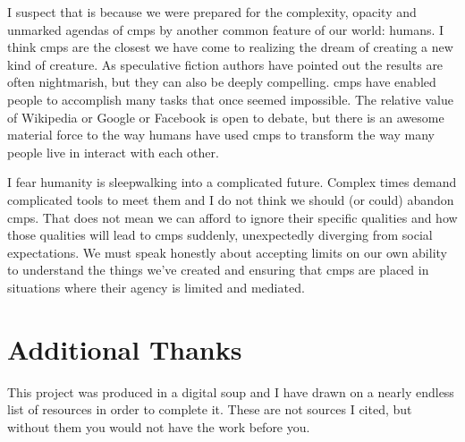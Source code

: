 \documentclass[a4paper,man,natbib,floatsintext]{apa6}
\begin{document}
  I suspect that is because we were prepared for the complexity, opacity and unmarked agendas of \glspl{cmp} by another common feature of our world: humans. I think \glspl{cmp} are the closest we have come to realizing the dream of creating a new kind of creature. As speculative fiction authors have pointed out the results are often nightmarish, but they can also be deeply compelling. \Glspl{cmp} have enabled people to accomplish many tasks that once seemed impossible. The relative value of Wikipedia or Google or Facebook is open to debate, but there is an awesome material force to the way humans have used \glspl{cmp} to transform the way many people live in interact with each other.

  I fear humanity is sleepwalking into a complicated future. Complex times demand complicated tools to meet them and I do not think we should (or could) abandon \glspl{cmp}. That does not mean we can afford to ignore their specific qualities and how those qualities will lead to \glspl{cmp} suddenly, unexpectedly diverging from social expectations. We must speak honestly about accepting limits on our own ability to understand the things we've created and ensuring that \glspl{cmp} are placed in situations where their agency is limited and mediated. 
  \newpage

   \singlespacing
   \printnoidxglossaries

  \section{Additional Thanks}
  This project was produced in a digital soup and I have drawn on a nearly endless list of resources in order to complete it. These are not sources I cited, but without them you would not have the work before you.
\end{document}
